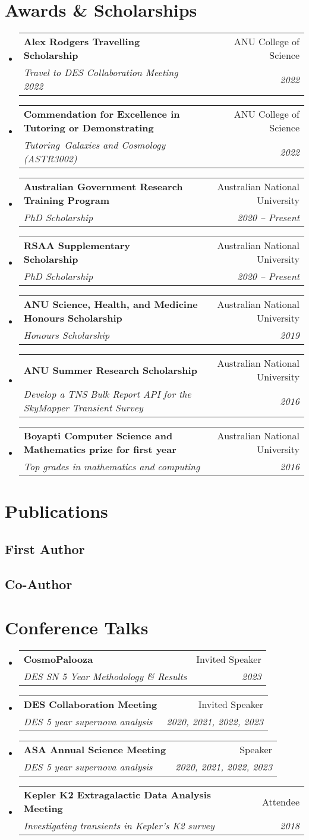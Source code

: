 \documentclass[letterpaper,11pt]{article}
\makeatletter
\newcommand{\resumeItem}[1]{
  \item\small{
    {#1 \vspace{-2pt}}
  }
}
\newcommand{\resumeSubheading}[4]{
  \vspace{-2pt}\item
    \begin{tabular*}{0.97\textwidth}[t]{l@{\extracolsep{\fill}}r}
      \textbf{#1} & #2 \\
      \textit{\small#3} & \textit{\small #4} \\
    \end{tabular*}\vspace{-7pt}
}
\newcommand{\resumeSubHeadingListStart}{\begin{itemize}[leftmargin=0.15in, label={}]}
\newcommand{\resumeSubHeadingListEnd}{\end{itemize}}
\newcommand{\resumeItemListStart}{\begin{itemize}}
\newcommand{\resumeItemListEnd}{\end{itemize}\vspace{-5pt}}
\newcommand{\awardElement}[5]{%
    \resumeSubHeadingListStart
        \resumeSubheading
            {#1}
            {#2}
            {#3}
            {#4}
            \ifthenelse{\isempty{#5}}{}{%
                \resumeItemListStart
                    \renewcommand*{\do}[1]{\resumeItem{##1}}
                    \docsvlist{#5}%
                \resumeItemListEnd
            }%
    \resumeSubHeadingListEnd
}
\newcommand{\conferenceElement}[5]{%
    \resumeSubHeadingListStart
        \resumeSubheading
            {#1}
            {#2}
            {#3}
            {#4}
            \ifthenelse{\isempty{#5}}{}{%
                \resumeItemListStart
                    \renewcommand*{\do}[1]{\resumeItem{##1}}
                    \docsvlist{#5}%
                \resumeItemListEnd
            }%
    \resumeSubHeadingListEnd
}
\makeatother
\begin{document}
\section{Awards \& Scholarships}

    \awardElement{Alex Rodgers Travelling Scholarship}{ANU College of Science}{Travel to DES Collaboration Meeting 2022}{2022}{}
    
    \awardElement{Commendation for Excellence in Tutoring or Demonstrating}{ANU College of Science}{Tutoring~\textit{Galaxies and Cosmology (ASTR3002)}}{2022}{}
    
    \awardElement{Australian Government Research Training Program}{Australian National University}{PhD Scholarship}{2020 -- Present}{}
    
    \awardElement{RSAA Supplementary Scholarship}{Australian National University}{PhD Scholarship}{2020 -- Present}{}
    
    \awardElement{ANU Science, Health, and Medicine Honours Scholarship}{Australian National University}{Honours Scholarship}{2019}{}
    
    \awardElement{ANU Summer Research Scholarship}{Australian National University}{Develop a TNS Bulk Report API for the SkyMapper Transient Survey}{2016}{}
    
    \awardElement{Boyapti Computer Science and Mathematics prize for first year}{Australian National University}{Top grades in mathematics and computing}{2016}{}

\section{Publications}

    \subsection{First Author}

    \subsection{Co-Author}

\section{Conference Talks}

    \conferenceElement{CosmoPalooza}{Invited Speaker}{DES SN 5 Year Methodology \& Results}{2023}{}
    \conferenceElement{DES Collaboration Meeting}{Invited Speaker}{DES 5 year supernova analysis}{2020, 2021, 2022, 2023}{}
    \conferenceElement{ASA Annual Science Meeting}{Speaker}{DES 5 year supernova analysis}{2020, 2021, 2022, 2023}{}
    \conferenceElement{Kepler K2 Extragalactic Data Analysis Meeting}{Attendee}{Investigating transients in Kepler's K2 survey}{2018}{}
\end{document}
